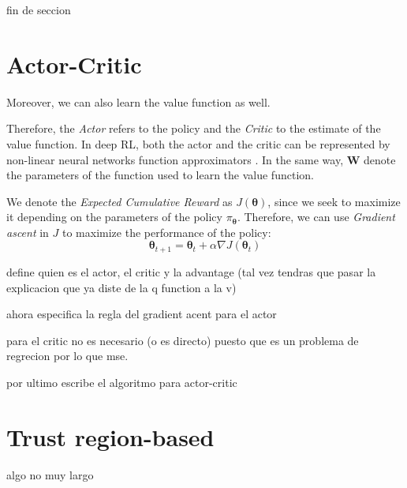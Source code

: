 \documentclass[twoside,twocolumn]{article}
\begin{document}
fin de seccion


\section{Actor-Critic}

Moreover, we can also learn the value function as well.

Therefore, the \emph{Actor} refers to the policy and the \emph{Critic} to the estimate of the value function. In deep RL, both the actor and the critic can be represented by non-linear neural networks function approximators \cite{mnih2016asynchronous}.
 In the same way, $\boldsymbol{W}$ denote the parameters of the function used to learn the value function.

We denote the \emph{Expected Cumulative Reward} as $J(\boldsymbol{\theta})$, since we seek to maximize it depending on the parameters of the policy $\pi_{\boldsymbol{\theta}}$. Therefore, we can use \emph{Gradient ascent} in $J$ to maximize the performance of the policy:
\begin{equation}
  \boldsymbol{\theta}_{t+1} = \boldsymbol{\theta}_{t} + \alpha \nabla J(\boldsymbol{\theta}_t)
\end{equation}

define quien es el actor, el critic y la advantage (tal vez tendras que pasar la explicacion que ya diste de la q function a la v)

ahora especifica la regla del gradient acent para el actor

para el critic no es necesario (o es directo) puesto que es un problema de regrecion por lo que mse.

por ultimo escribe el algoritmo para actor-critic

\section{Trust region-based}

algo no muy largo


\printbibliography

\end{document}
